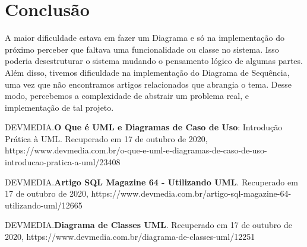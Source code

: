 \documentclass[a4paper]{article}
\begin{document}
  \section{Conclusão}
  A maior dificuldade estava em fazer um Diagrama e só na implementação do próximo
  perceber que faltava uma funcionalidade ou classe no sistema. Isso poderia desestruturar
  o sistema mudando o pensamento lógico de algumas partes.\\
  Além disso, tivemos dificuldade na implementação do  Diagrama de Sequência,
  uma vez que não encontramos artigos relacionados que abrangia o tema.
  Desse modo, percebemos a complexidade de abstrair um problema real,
  e implementação de tal projeto.

  \newpage
  \begin{thebibliography}{4}
    DEVMEDIA.\textbf{O Que é UML e Diagramas de Caso de Uso}: Introdução Prática à UML. 
    Recuperado em 17 de outubro de 2020,
    https://www.devmedia.com.br/o-que-e-uml-e-diagramas-de-caso-de-uso-introducao-pratica-a-uml/23408

    DEVMEDIA.\textbf{Artigo SQL Magazine 64 - Utilizando UML}. 
    Recuperado em 17 de outubro de 2020,
    https://www.devmedia.com.br/artigo-sql-magazine-64-utilizando-uml/12665
  
    DEVMEDIA.\textbf{Diagrama de Classes UML}. 
    Recuperado em 17 de outubro de 2020,
    https://www.devmedia.com.br/diagrama-de-classes-uml/12251
    \end{thebibliography}
     
  
\end{document}

